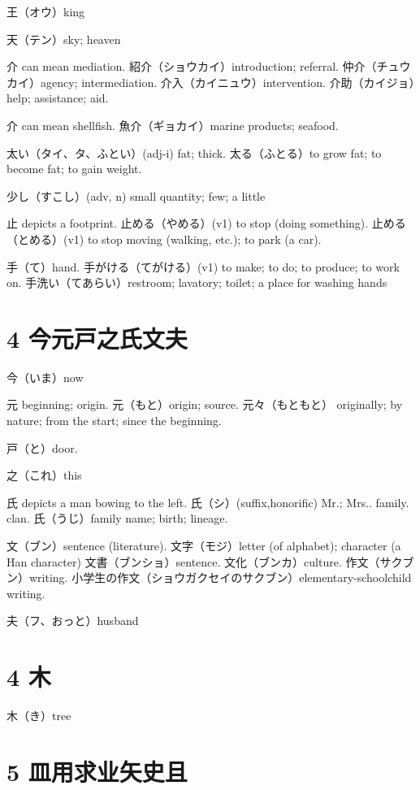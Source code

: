 王（オウ）king

天（テン）sky; heaven

介 can mean mediation.
紹介（ショウカイ）introduction; referral.
仲介（チュウカイ）agency; intermediation.
介入（カイニュウ）intervention.
介助（カイジョ）help; assistance; aid.

介 can mean shellfish.
魚介（ギョカイ）marine products; seafood.

太い（タイ、タ、ふとい）(adj-i) fat; thick.
太る（ふとる）to grow fat; to become fat; to gain weight.

少し（すこし）(adv, n) small quantity; few; a little

止 depicts a footprint.
止める（やめる）(v1) to stop (doing something).
止める（とめる）(v1) to stop moving (walking, etc.); to park (a car).

手（て）hand.
手がける（てがける）(v1) to make; to do; to produce; to work on.
手洗い（てあらい）restroom; lavatory; toilet; a place for washing hands

\section{4 今元戸之氏文夫}

今（いま）now

元 beginning; origin.
元（もと）origin; source.
元々（もともと）
originally; by nature; from the start; since the beginning.

戸（と）door.

之（これ）this

氏 depicts a man bowing to the left.
氏（シ）(suffix,honorific) Mr.; Mrs.. family. clan.
氏（うじ）family name; birth; lineage.

文（ブン）sentence (literature).
文字（モジ）letter (of alphabet); character (a Han character)
文書（ブンショ）sentence.
文化（ブンカ）culture.
作文（サクブン）writing.
小学生の作文（ショウガクセイのサクブン）elementary-schoolchild writing.

夫（フ、おっと）husband

\section{4 木}

木（き）tree

\section{5 皿用求业矢史且}

